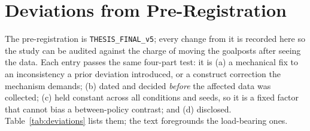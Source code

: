 

\section{Deviations from Pre-Registration}
\label{sec:deviations}

The pre-registration is \texttt{THESIS\_FINAL\_v5}; every change from it is recorded here so
the study can be audited against the charge of moving the goalposts after seeing the data.
Each entry passes the same four-part test: it is (a) a mechanical fix to an inconsistency a
prior deviation introduced, or a construct correction the mechanism demands; (b) dated and
decided \emph{before} the affected data was collected; (c) held constant across all
conditions and seeds, so it is a fixed factor that cannot bias a between-policy contrast; and
(d) disclosed. Table~\ref{tab:deviations} lists them; the text foregrounds the load-bearing
ones.


